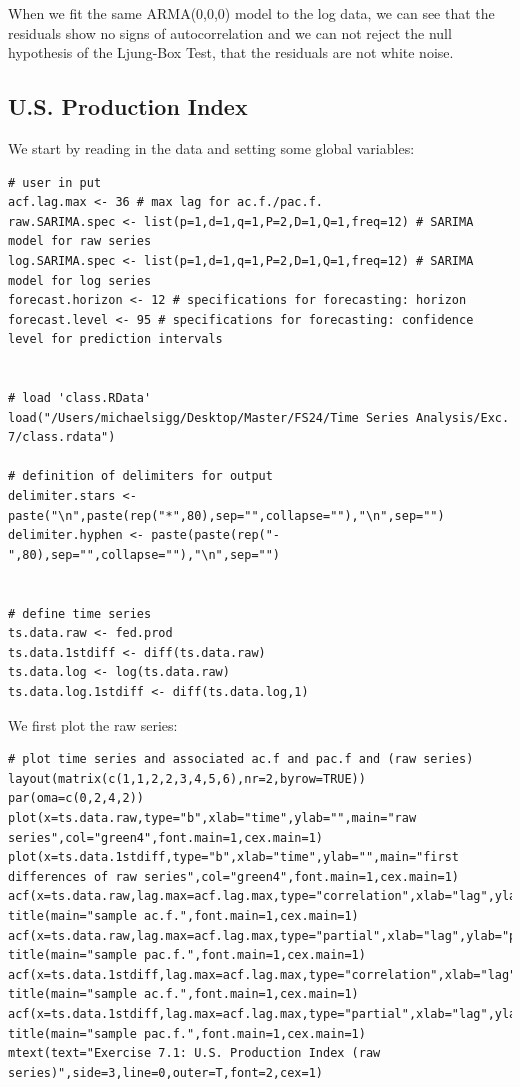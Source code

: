  When we fit the same ARMA(0,0,0) model to the log data, we can see that the residuals show no signs of autocorrelation and we can not reject the null hypothesis of the Ljung-Box Test, that the residuals are not white noise. 

\subsection{U.S. Production Index}


We start by reading in the data and setting some global variables:\\



\begin{lstlisting}
# user in put
acf.lag.max <- 36 # max lag for ac.f./pac.f.
raw.SARIMA.spec <- list(p=1,d=1,q=1,P=2,D=1,Q=1,freq=12) # SARIMA model for raw series
log.SARIMA.spec <- list(p=1,d=1,q=1,P=2,D=1,Q=1,freq=12) # SARIMA model for log series
forecast.horizon <- 12 # specifications for forecasting: horizon
forecast.level <- 95 # specifications for forecasting: confidence level for prediction intervals


# load 'class.RData'
load("/Users/michaelsigg/Desktop/Master/FS24/Time Series Analysis/Exc. 7/class.rdata")

# definition of delimiters for output
delimiter.stars <- paste("\n",paste(rep("*",80),sep="",collapse=""),"\n",sep="")
delimiter.hyphen <- paste(paste(rep("-",80),sep="",collapse=""),"\n",sep="")


# define time series
ts.data.raw <- fed.prod
ts.data.1stdiff <- diff(ts.data.raw)
ts.data.log <- log(ts.data.raw)
ts.data.log.1stdiff <- diff(ts.data.log,1)
\end{lstlisting}

We first plot the raw series: \\

\begin{lstlisting}
# plot time series and associated ac.f and pac.f and (raw series)
layout(matrix(c(1,1,2,2,3,4,5,6),nr=2,byrow=TRUE))
par(oma=c(0,2,4,2))
plot(x=ts.data.raw,type="b",xlab="time",ylab="",main="raw series",col="green4",font.main=1,cex.main=1) 
plot(x=ts.data.1stdiff,type="b",xlab="time",ylab="",main="first differences of raw series",col="green4",font.main=1,cex.main=1)
acf(x=ts.data.raw,lag.max=acf.lag.max,type="correlation",xlab="lag",ylab="ac.f.",main="")
title(main="sample ac.f.",font.main=1,cex.main=1)
acf(x=ts.data.raw,lag.max=acf.lag.max,type="partial",xlab="lag",ylab="pac.f.",main="") 
title(main="sample pac.f.",font.main=1,cex.main=1) 
acf(x=ts.data.1stdiff,lag.max=acf.lag.max,type="correlation",xlab="lag",ylab="ac.f.",main="")
title(main="sample ac.f.",font.main=1,cex.main=1)
acf(x=ts.data.1stdiff,lag.max=acf.lag.max,type="partial",xlab="lag",ylab="pac.f.",main="")
title(main="sample pac.f.",font.main=1,cex.main=1)
mtext(text="Exercise 7.1: U.S. Production Index (raw series)",side=3,line=0,outer=T,font=2,cex=1)
\end{lstlisting}


